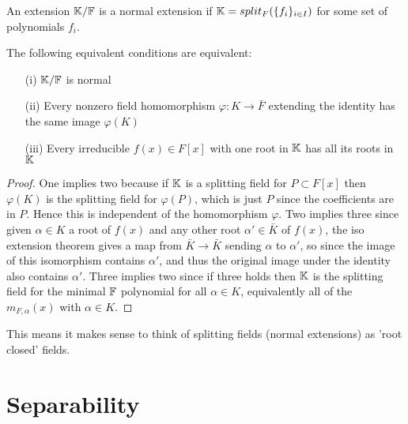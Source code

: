 \documentclass[11pt]{article}
\begin{document}
\begin{definition}
  An extension $\mathbb{K}/\mathbb{F}$ is a normal extension if $\mathbb{K} = split_F(\{f_i\}_{i \in I})$ for some set of polynomials $f_i$.
\end{definition}
\begin{theorem}
  The following equivalent conditions are equivalent:
  \begin{itemize}
  \item[(i)] $\mathbb{K}/\mathbb{F}$ is normal
  \item[(ii)] Every nonzero field homomorphism $\varphi : K \rightarrow \bar F$ extending the identity has the same image $\varphi(K)$
  \item[(iii)] Every irreducible $f(x) \in F[x]$ with one root in $\mathbb{K}$ has all its roots in $\mathbb{K}$
  \end{itemize}
\end{theorem}
\begin{proof}
  One implies two because if $\mathbb{K}$ is a splitting field for $P \subset F[x]$ then $\varphi(K)$ is the splitting field for $\varphi(P)$, which is just $P$ since the coefficients are in $P$. Hence this is independent of the homomorphism $\varphi$.
  Two implies three since given $\alpha \in K$ a root of $f(x)$ and any other root $\alpha' \in \bar K$ of $f(x)$, the iso extension theorem gives a map from $\bar K \rightarrow \bar K$ sending $\alpha$ to $\alpha'$, so since the image of this isomorphism contains $\alpha'$, and thus the original image under the identity also contains $\alpha'$.
  Three implies two since if three holds then $\mathbb{K}$ is the splitting field for the minimal $\mathbb{F}$ polynomial for all $\alpha \in K$, equivalently all of the $m_{F,\alpha}(x)$ with $\alpha \in K$.
\end{proof}
\begin{remark}
  This means it makes sense to think of splitting fields (normal extensions) as 'root closed' fields.
\end{remark}


\section{Separability}
\end{document}
